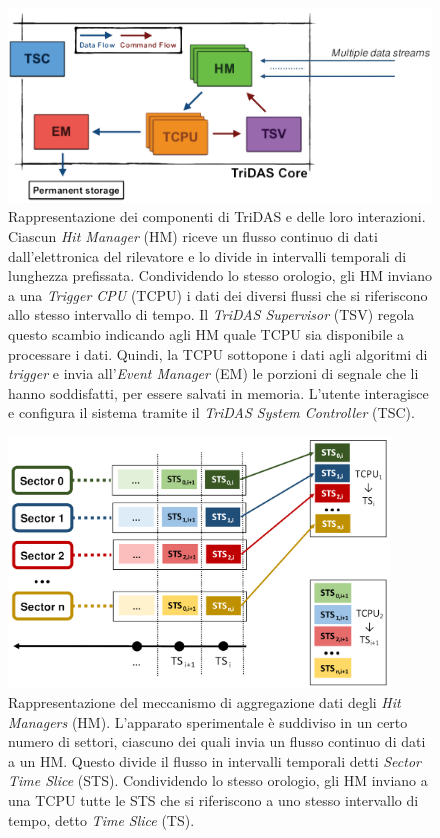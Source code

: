 \documentclass[../main.tex]{subfiles}
\begin{document}
\begin{figure}[tb]
    \centering
    \includegraphics[width=\textwidth]{tridas_scheme_more_trasp.png}
    \caption{
	    Rappresentazione dei componenti di TriDAS e delle loro interazioni. Ciascun \emph{Hit Manager} (HM) riceve un flusso continuo di dati dall'elettronica del rilevatore e lo divide in intervalli temporali di lunghezza prefissata. Condividendo lo stesso orologio, gli HM inviano a una \emph{Trigger CPU} (TCPU) i dati dei diversi flussi che si riferiscono allo stesso intervallo di tempo. Il \emph{TriDAS Supervisor} (TSV) regola questo scambio indicando agli HM quale TCPU sia disponibile a processare i dati. Quindi, la TCPU sottopone i dati agli algoritmi di \emph{trigger} e invia all'\emph{Event Manager} (EM) le porzioni di segnale che li hanno soddisfatti, per essere salvati in memoria. L'utente interagisce e configura il sistema tramite il \emph{TriDAS System Controller} (TSC).  
	\cite{chiarusi}}
    \label{fig:tridas}
\end{figure}

\begin{figure}[tb]
    \centering
    \includegraphics[width=0.9\textwidth]{hm_trasp.png}
    \caption{
	Rappresentazione del meccanismo di aggregazione dati degli \emph{Hit Managers} (HM). 
L'apparato sperimentale è suddiviso in un certo numero di settori, ciascuno dei quali invia un flusso continuo di dati a un HM. Questo divide il flusso in intervalli temporali detti \emph{Sector Time Slice} (STS). Condividendo lo stesso orologio, gli HM inviano a una TCPU tutte le STS che si riferiscono a uno stesso intervallo di tempo, detto \emph{Time Slice} (TS).
	\cite{chiarusi}}
    \label{fig:hmtcpu}
\end{figure}
\end{document}
